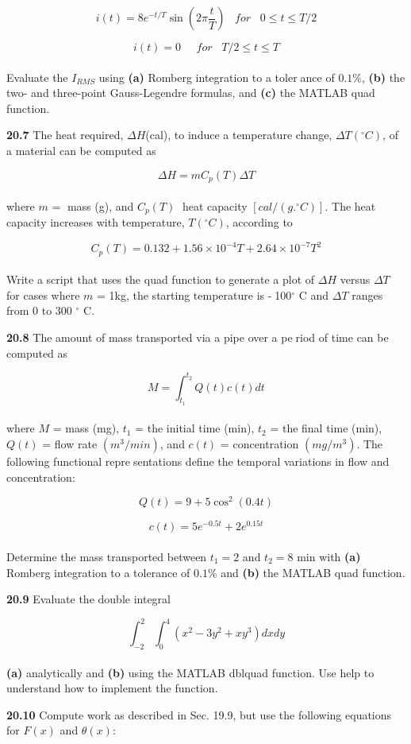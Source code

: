\begin{multicols}{2}
	$$ i(t) = 8e^{-t/T} \sin \left( 2\pi \dfrac{t}{T} \right) \; \; \; for \; \; \; 0 \leq t \leq T/2$$
	
	$$i(t) = 0 \; \; \; \; \; for \; \; \; T/2 \leq t \leq T$$\\
Evaluate the $I_{RMS}$ using \textbf{(a)} Romberg integration to a tolerance of $0.1\% $, \textbf{(b)} the two- and three-point Gauss-Legendre
formulas, and \textbf{(c)} the MATLAB quad function.

\textbf{20.7} The heat required, $\Delta H$(cal), to induce a temperature change, $\Delta T(^{\circ} C)$, of a material can be computed as

	$$\Delta H = mC_{p} (T) \Delta T$$\\
where $m$ = mass (g), and $C_{p}(T)$  heat capacity $[cal/(g .^{\circ}C)]$.
The heat capacity increases with temperature, $T (^{\circ}C)$, 
according to

	$$C_{p} (T) = 0.132 + 1.56 × 10^{-4} T + 2.64 × 10^{-7} T^2$$\\
Write a script that uses the quad function to generate a plot
of $\Delta H$ versus $\Delta T$ for cases where $m$ = 1kg, the starting
temperature is -100$^{\circ}$ C and $\Delta T$ ranges from 0 to 300 $^{\circ}$ C.

\textbf{20.8} The amount of mass transported via a pipe over a period of time can be computed as

	$$M=\int^{t_{2}}_{t_{1}} Q(t)c(t) dt$$\\
where $M$ = mass (mg), $t_{1}$ = the initial time (min), $t_{2}$ = the
final time (min), $Q(t)$ = flow rate $(m^{3}
/min)$, and $c(t)$ =
concentration $(mg/m^{3})$. The following functional representations define the temporal variations in flow and
concentration:

	$$Q(t) = 9 + 5 \cos^{2}(0.4t) $$
	
	$$c(t) = 5e^{-0.5t} + 2e^{0.15t}$$\\
Determine the mass transported between $t_{1} = 2$ and
$t_{2} = 8$ min with \textbf{(a)} Romberg integration to a tolerance of
$0.1\%$ and \textbf{(b)} the MATLAB quad function.

\textbf{20.9} Evaluate the double integral

	$$\int^{2}_{-2} \int^{4}_{0} (x^{2} - 3y^{2} + xy^{3}) dx dy$$\\
\textbf{(a)} analytically and \textbf{(b)} using the MATLAB dblquad 
function. Use help to understand how to implement the
function.

\textbf{20.10} Compute work as described in Sec. 19.9, but use the
following equations for $F(x)$ and $\theta(x)$:


\end{multicols}
